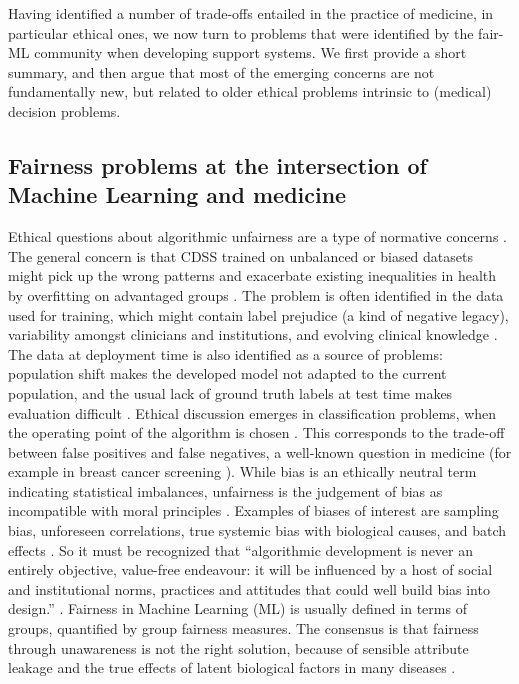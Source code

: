 Having identified a number of trade-offs entailed in the practice of medicine, in particular ethical ones, we now turn to problems that were identified by the fair-ML community when developing support systems.
We first provide a short summary, and then argue that most of the emerging concerns are not fundamentally new, but related to older ethical problems intrinsic to (medical) decision problems.


\subsection{Fairness problems at the intersection of Machine Learning and medicine}
    Ethical questions about algorithmic unfairness are a type of normative concerns \cite{Morley2020}.
    The general concern is that CDSS trained on unbalanced or biased datasets might pick up the wrong patterns and exacerbate existing inequalities in health by overfitting on advantaged groups \cite{Morley2020}\cite{Chen2021}.
    The problem is often identified in the data used for training, which might contain label prejudice (a kind of negative legacy), variability amongst clinicians and institutions, and evolving clinical knowledge \cite{Chen2021}.
    The data at deployment time is also identified as a source of problems: population shift makes the developed model not adapted to the current population, and the usual lack of ground truth labels at test time makes evaluation difficult \cite{Chen2021}.
    Ethical discussion emerges in classification problems, when the operating point of the algorithm is chosen \cite{Fletcher2021}.
    This corresponds to the trade-off between false positives and false negatives, a well-known question in medicine (for example in breast cancer screening \cite{Fletcher2021}).
    While bias is an ethically neutral term indicating statistical imbalances, unfairness is the judgement of bias as incompatible with moral principles \cite{Fletcher2021}.
    Examples of biases of interest are sampling bias, unforeseen correlations, true systemic bias with biological causes, and batch effects \cite{Fletcher2021}.
    So it must be recognized that ``algorithmic development is never an entirely objective, value-free endeavour: it will be influenced by a host of social and institutional norms, practices and attitudes that could well build bias into design.'' \cite[p.~673]{Zerilli2019}.
    Fairness in Machine Learning (ML) is usually defined in terms of groups, quantified by group fairness measures.
    The consensus is that fairness through unawareness is not the right solution, because of sensible attribute leakage and the true effects of latent biological factors in many diseases \cite{Chen2021}.



